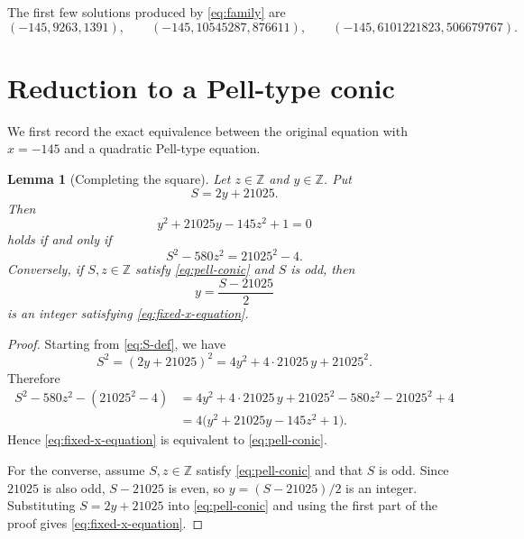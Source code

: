 \documentclass[11pt]{article}
\numberwithin{equation}{section}
\newtheorem{lemma}[theorem]{Lemma}
\newcommand{\Z}{\mathbb Z}
\begin{document}
The first few solutions produced by \eqref{eq:family} are
\begin{equation*}
        (-145,9263,1391),
        \qquad
        (-145,10545287,876611),
        \qquad
        (-145,6101221823,506679767).
\end{equation*}

\section{Reduction to a Pell-type conic}

We first record the exact equivalence between the original equation with
$x=-145$ and a quadratic Pell-type equation.

\begin{lemma}[Completing the square]\label{lem:completion}
Let $z\in\Z$ and $y\in\Z$. Put
\begin{equation}\label{eq:S-def}
        S=2y+21025.
\end{equation}
Then
\begin{equation}\label{eq:fixed-x-equation}
        y^2+21025y-145z^2+1=0
\end{equation}
holds if and only if
\begin{equation}\label{eq:pell-conic}
        S^2-580z^2=21025^2-4.
\end{equation}
Conversely, if $S,z\in\Z$ satisfy \eqref{eq:pell-conic} and $S$ is odd, then
\begin{equation}\label{eq:y-from-S}
        y=\frac{S-21025}{2}
\end{equation}
is an integer satisfying \eqref{eq:fixed-x-equation}.
\end{lemma}

\begin{proof}
Starting from \eqref{eq:S-def}, we have
\begin{equation*}
        S^2=(2y+21025)^2=4y^2+4\cdot 21025\,y+21025^2.
\end{equation*}
Therefore
\begin{align*}
        S^2-580z^2-(21025^2-4)
        &=4y^2+4\cdot 21025\,y+21025^2-580z^2-21025^2+4\\
        &=4\bigl(y^2+21025y-145z^2+1\bigr).
\end{align*}
Hence \eqref{eq:fixed-x-equation} is equivalent to \eqref{eq:pell-conic}.

For the converse, assume $S,z\in\Z$ satisfy \eqref{eq:pell-conic} and that
$S$ is odd. Since $21025$ is also odd, $S-21025$ is even, so
$y=(S-21025)/2$ is an integer. Substituting $S=2y+21025$ into
\eqref{eq:pell-conic} and using the first part of the proof gives
\eqref{eq:fixed-x-equation}.
\end{proof}
\end{document}
